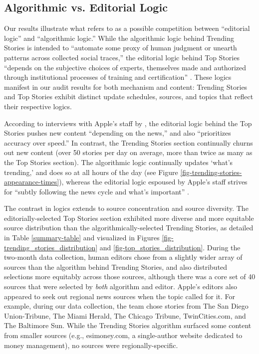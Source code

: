 \subsection{Algorithmic vs. Editorial Logic}
Our results illustrate what \citet{Gillespie2014} refers to as a possible competition between ``editorial logic'' and ``algorithmic logic.'' While the algorithmic logic behind Trending Stories is intended to ``automate some proxy of human judgment or unearth patterns across collected social traces,'' the editorial logic behind Top Stories ``depends on the subjective choices of experts, themselves made and authorized through institutional processes of training and certification'' \citep{Gillespie2014}. These logics manifest in our audit results for both mechanism and  content: Trending Stories and Top Stories exhibit distinct update schedules, sources, and topics that reflect their respective logics.

According to interviews with Apple's staff by \citet{Nicas2018}, the editorial logic behind the Top Stories pushes new content ``depending on the news,'' and also ``prioritizes accuracy over speed.'' In contrast, the Trending Stories section continually churns out new content (over 50 stories per day on average, more than twice as many as the Top Stories section). The algorithmic logic continually updates `what's trending,' and does so at all hours of the day (see Figure \ref{fig-trending-stories-appearance-times}), whereas the editorial logic espoused by Apple's staff strives for ``subtly following the news cycle and what's important'' \citep{Nicas2018}.

The contrast in logics extends to source concentration and source diversity. The editorially-selected Top Stories section exhibited more diverse and more equitable source distribution than the algorithmically-selected Trending Stories, as detailed in Table \ref{summary-table} and visualized in Figures \ref{fig-trending_stories_distribution} and \ref{fig-top_stories_distribution}. During the two-month data collection, human editors chose from a slightly wider array of sources than the algorithm behind Trending Stories, and also distributed selections more equitably across those sources, although there was a core set of 40 sources that were selected by \textit{both} algorithm and editor. Apple's editors also appeared to seek out regional news sources when the topic called for it. For example, during our data collection, the team chose stories from The San Diego Union-Tribune, The Miami Herald, The Chicago Tribune, TwinCities.com, and The Baltimore Sun. While the Trending Stories algorithm surfaced some content from smaller sources (e.g., esimoney.com, a single-author website dedicated to money management), no sources were regionally-specific.


